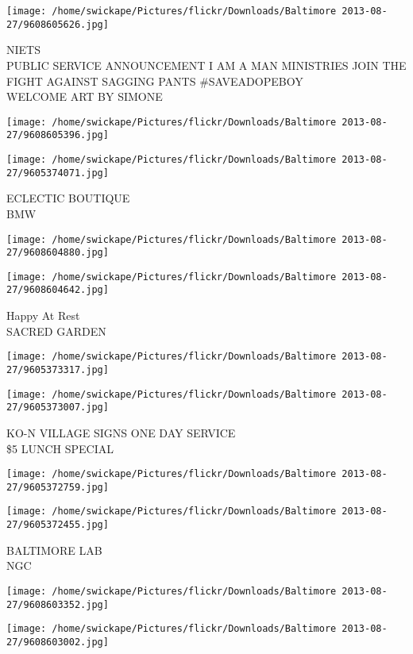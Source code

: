 \documentclass[10pt,letterpaper]{article}
\begin{document}
\texttt{[image: /home/swickape/Pictures/flickr/Downloads/Baltimore 2013-08-27/9608605626.jpg]}

NIETS\\
PUBLIC SERVICE ANNOUNCEMENT I AM A MAN MINISTRIES JOIN THE FIGHT AGAINST SAGGING PANTS \#SAVEADOPEBOY\\
WELCOME ART BY SIMONE
\pagebreak

\texttt{[image: /home/swickape/Pictures/flickr/Downloads/Baltimore 2013-08-27/9608605396.jpg]}

\vspace{0.25in}
\texttt{[image: /home/swickape/Pictures/flickr/Downloads/Baltimore 2013-08-27/9605374071.jpg]}

ECLECTIC BOUTIQUE\\
BMW
\pagebreak

\texttt{[image: /home/swickape/Pictures/flickr/Downloads/Baltimore 2013-08-27/9608604880.jpg]}

\vspace{0.25in}
\texttt{[image: /home/swickape/Pictures/flickr/Downloads/Baltimore 2013-08-27/9608604642.jpg]}

Happy At Rest\\
SACRED GARDEN
\pagebreak

\texttt{[image: /home/swickape/Pictures/flickr/Downloads/Baltimore 2013-08-27/9605373317.jpg]}

\vspace{0.25in}
\texttt{[image: /home/swickape/Pictures/flickr/Downloads/Baltimore 2013-08-27/9605373007.jpg]}

KO{-}N VILLAGE SIGNS ONE DAY SERVICE\\
\$5 LUNCH SPECIAL
\pagebreak

\texttt{[image: /home/swickape/Pictures/flickr/Downloads/Baltimore 2013-08-27/9605372759.jpg]}

\vspace{0.25in}
\texttt{[image: /home/swickape/Pictures/flickr/Downloads/Baltimore 2013-08-27/9605372455.jpg]}

BALTIMORE LAB\\
NGC
\pagebreak

\texttt{[image: /home/swickape/Pictures/flickr/Downloads/Baltimore 2013-08-27/9608603352.jpg]}

\vspace{0.25in}
\texttt{[image: /home/swickape/Pictures/flickr/Downloads/Baltimore 2013-08-27/9608603002.jpg]}
\end{document}
